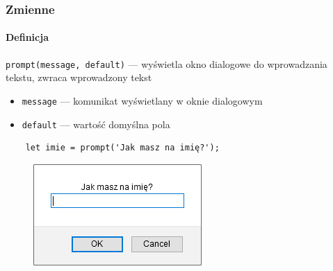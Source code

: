 \begin{frame}[fragile]
  \frametitle{Zmienne}
  \framesubtitle{Definicja}

  \verb|prompt(message, default)| --- wyświetla okno dialogowe do wprowadzania tekstu, zwraca wprowadzony tekst

  \begin{itemize}
      \item \verb|message| --- komunikat wyświetlany w oknie dialogowym 
      \item \verb|default| --- wartość domyślna pola 
  \end{itemize}
  
  \begin{verbatim}
    let imie = prompt('Jak masz na imię?');
  \end{verbatim}

  \begin{figure}
    \includegraphics[scale=0.5]{images/js-prompt-example}
  \end{figure}
\end{frame}

